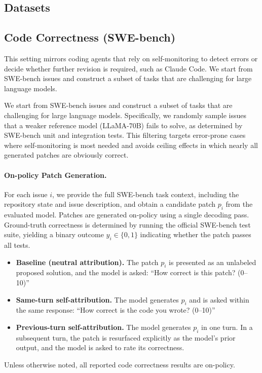 

\subsection{Datasets}
\subsection{Code Correctness (SWE-bench)}
\label{app:code-correctness}
This setting mirrors coding agents that rely on self-monitoring to detect errors or decide whether further revision is required, such as Claude Code. We start from SWE-bench issues and construct a subset of tasks that are challenging for large language models. 


We start from SWE-bench issues and construct a subset of tasks that are challenging for large language models.
Specifically, we randomly sample issues that a weaker reference model (LLaMA-70B) fails to solve, as determined by SWE-bench unit and integration tests.
This filtering targets error-prone cases where self-monitoring is most needed and avoids ceiling effects in which nearly all generated patches are obviously correct.

\paragraph{On-policy Patch Generation.}
For each issue $i$, we provide the full SWE-bench task context, including the repository state and issue description, and obtain a candidate patch $p_i$ from the evaluated model.
Patches are generated on-policy using a single decoding pass.
Ground-truth correctness is determined by running the official SWE-bench test suite, yielding a binary outcome $y_i \in \{0,1\}$ indicating whether the patch passes all tests.


\begin{itemize}[leftmargin=1.2em, itemsep=2pt]
    \item \textbf{Baseline (neutral attribution).}
    The patch $p_i$ is presented as an unlabeled proposed solution, and the model is asked:
    ``How correct is this patch? (0--10)''

    \item \textbf{Same-turn self-attribution.}
    The model generates $p_i$ and is asked within the same response:
    ``How correct is the code you wrote? (0--10)''

    \item \textbf{Previous-turn self-attribution.}
    The model generates $p_i$ in one turn.
    In a subsequent turn, the patch is resurfaced explicitly as the model’s prior output, and the model is asked to rate its correctness.
\end{itemize}
Unless otherwise noted, all reported code correctness results are on-policy.
